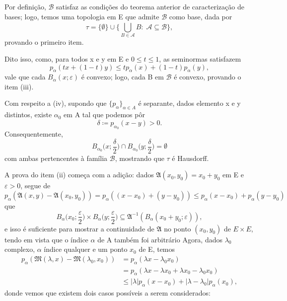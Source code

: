 \documentclass[../distribution_theory_notes.tex]{subfiles}
\begin{document}
\begin{proof*}
  Por definição, \(\mathcal{B}\) satisfaz as condições do teorema anterior de caracterização de bases; logo, temos uma topologia em E que admite \(\mathcal{B}\) como base, dada por 
    \[
      \tau =\{\emptyset \}\cup \biggl\{\bigcup_{B\in \mathcal{A}}^{}B:\; \mathcal{A}\subseteq \mathcal{B}\biggr\},
    \]
    provando o primeiro item. 

    Dito isso, como, para todos x e y em E e \(0\leq t\leq 1\), as seminormas satisfazem 
      \[
        p_{\alpha }(tx + (1-t)y)\leq tp_{\alpha }(x)+ (1-t)p_{\alpha }(y),
      \]
      vale que cada \(B_{\alpha }(x; \varepsilon )\) é convexo; logo, cada B em \(\mathcal{B}\) é convexo, provando o item (iii).

      Com respeito a (iv), supondo que \(\{p_{\alpha }\}_{\alpha \in A}\) é separante, dados elemento x e y distintos, existe \(\alpha_{0}\) em A tal que podemos pôr
        \[
          \delta \coloneqq p_{\alpha_{0}}(x-y) >0.
        \]
        Consequentemente, 
          \[
            B_{\alpha_{0}}\biggl(x; \frac{\delta }{2}\biggr)\cap B_{\alpha_{0}}\biggl(y; \frac{\delta }{2}\biggr) = \emptyset 
          \]
          com ambas pertencentes à família \(\mathcal{B}\), mostrando que \(\tau \) é Hausdorff. 

          A prova do item (ii) começa com a adição: dados \(\mathfrak{A}(x_{0}, y_{0})=x_{0}+y_{0}\) em E e \(\varepsilon >0\), segue de 
            \[
              p_{\alpha }(\mathfrak{A}(x, y)-\mathfrak{A}(x_{0}, y_{0}))=p_{\alpha }((x-x_{0})+(y-y_{0}))\leq p_{\alpha }(x-x_{0})+p_{\alpha }(y-y_{0})
            \]
            que 
              \[
                B_{\alpha }\biggl(x_{0}; \frac{\varepsilon }{2}\biggr)\times B_{\alpha }\biggl(y; \frac{\varepsilon }{2}\biggr)\subseteq \mathfrak{A}^{-1}(B_{\alpha }(x_{0}+y_{0}; \varepsilon )),
              \]
              e isso é suficiente para mostrar a continuidade de \(\mathfrak{A}\) no ponto \((x_{0}, y_{0})\) de \(E\times E\), tendo em vista que o índice \(\alpha \) de A também foi arbitrário
              Agora, dados \(\lambda_{0}\) complexo, \(\alpha \) índice qualquer e um ponto \(x_{0}\) de E, temos 
             \begin{align*}
               p_{\alpha }(\mathfrak{M}(\lambda , x)-\mathfrak{M}(\lambda_{0}, x_{0})) &= p_{\alpha }(\lambda x - \lambda_{0}x_{0})\\ 
                                                                                       &=p_{\alpha }(\lambda x - \lambda x_{0} + \lambda x_{0} -\lambda_{0}x_{0})\\ 
                                                                                       &\leq |\lambda |p_{\alpha }(x-x_{0})+|\lambda -\lambda_{0}|p_{\alpha }(x_{0}),
             \end{align*}
             donde vemos que existem dois casos possíveis a serem considerados: 


\end{proof*}
\end{document}
